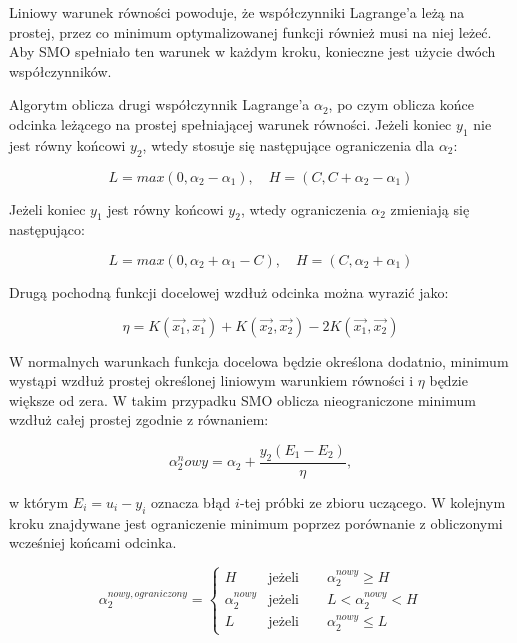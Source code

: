 \documentclass[[10pt,a4paper]{article}
\begin{document}
Liniowy warunek równości powoduje, że współczynniki Lagrange'a leżą na prostej, przez co minimum optymalizowanej funkcji również musi na niej leżeć.
Aby SMO spełniało ten warunek w każdym kroku, konieczne jest użycie dwóch współczynników.

Algorytm oblicza drugi współczynnik  Lagrange'a $\alpha_{2}$, po czym oblicza końce odcinka leżącego na prostej spełniającej warunek równości. Jeżeli koniec $y_1$ nie jest równy końcowi $y_2$, wtedy stosuje się następujące ograniczenia dla $\alpha_2$:

\begin{equation}
L = max(0,\alpha_2 - \alpha_1),\quad H = (C,C + \alpha_2 - \alpha_1)
\end{equation}

Jeżeli koniec $y_1$ jest równy końcowi $y_2$, wtedy ograniczenia $\alpha_2$ zmieniają się następująco:

\begin{equation}
L = max(0,\alpha_2 + \alpha_1 - C),\quad H = (C, \alpha_2 + \alpha_1)
\end{equation}

Drugą pochodną funkcji docelowej wzdłuż odcinka można wyrazić jako:

\begin{equation}
\eta = K(\overrightarrow{x_1},\overrightarrow{x_1}) + K(\overrightarrow{x_2},\overrightarrow{x_2}) - 2K(\overrightarrow{x_1},\overrightarrow{x_2})
\end{equation}

W normalnych warunkach funkcja docelowa będzie określona dodatnio, minimum wystąpi wzdłuż prostej określonej liniowym warunkiem równości i $\eta$ będzie większe od zera. W takim przypadku SMO oblicza nieograniczone minimum wzdłuż całej prostej zgodnie z równaniem:

\begin{equation}
\label{alfa2nowy}
\alpha_2^nowy = \alpha_2 + \frac{y_2(E_1-E_2)}{\eta},
\end{equation}

w którym $E_i = u_i - y_i$ oznacza błąd $i$-tej próbki ze zbioru uczącego. W kolejnym kroku znajdywane jest ograniczenie minimum poprzez porównanie z obliczonymi wcześniej końcami odcinka.

\begin{equation}
\alpha_2^{nowy,ograniczony} =  \begin{cases} 
H & \text{jeżeli} \qquad \alpha_2^{nowy} \geq H \\
\alpha_2^{nowy} & \text{jeżeli} \qquad L < \alpha_2^{nowy} < H \\
L & \text{jeżeli} \qquad \alpha_2^{nowy} \leq L
\end{cases}
\end{equation}
\end{document}
